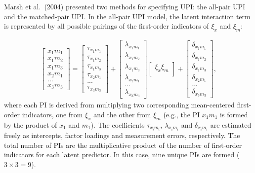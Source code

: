 \documentclass[
  man]{apa6}
\begin{document}
Marsh et al.~(2004) presented two methods for specifying UPI: the all-pair UPI and the matched-pair UPI. In the all-pair UPI model, the latent interaction term is represented by all possible pairings of the first-order indicators of \(\xi_{x}\) and \(\xi_{m}\):

\begin{align}
    \begin{bmatrix}
        x_{1}m_{1} \\
        x_{1}m_{2} \\
        x_{1}m_{3} \\ 
        x_{2}m_{1} \\
        ... \\
        x_{3}m_{3}
    \end{bmatrix} = 
    \begin{bmatrix}
        \tau_{x_{1}m_{1}} \\
        \tau_{x_{1}m_{2}} \\ 
        \tau_{x_{1}m_{3}} \\ 
        \tau_{x_{2}m_{1}} \\ 
        ...\\
        \tau_{x_{3}m_{3}} 
    \end{bmatrix} +
    \begin{bmatrix}
        \lambda_{x_{1}m_{1}} \\
        \lambda_{x_{1}m_{2}} \\ 
        \lambda_{x_{1}m_{3}} \\ 
        \lambda_{x_{2}m_{1}} \\ 
        ...\\
        \lambda_{x_{3}m_{3}}
    \end{bmatrix}
    \begin{bmatrix}
        \xi_{x}\xi_{m} \\
    \end{bmatrix} +
    \begin{bmatrix}
        \delta_{x_{1}m_{1}} \\
        \delta_{x_{1}m_{2}} \\ 
        \delta_{x_{1}m_{3}} \\
        \delta_{x_{2}m_{1}} \\
        ... \\
        \delta_{x_{3}m_{3}}
    \end{bmatrix},
\end{align}
where each PI is derived from multiplying two corresponding mean-centered first-order indicators, one from \(\xi_{x}\) and the other from \(\xi_{m}\) (e.g., the PI \(x_{1}m_{1}\) is formed by the product of \(x_{1}\) and \(m_{1}\)). The coefficients \({\tau_{x_{i}m_{i}}}\), \({\lambda_{x_{i}m_{i}}}\) and \({\delta_{x_{i}m_{i}}}\) are estimated freely as intercepts, factor loadings and measurement errors, respectively. The total number of PIs are the multiplicative product of the number of first-order indicators for each latent predictor. In this case, nine unique PIs are formed (\(3 \times 3 = 9\)).
\end{document}
